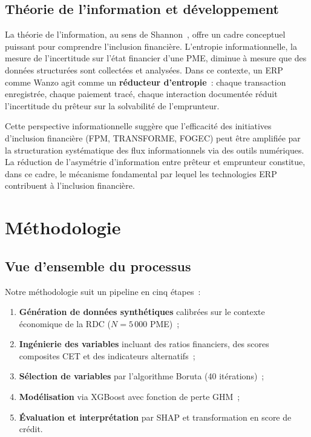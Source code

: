 \documentclass[12pt, a4paper, twocolumn]{article}
\begin{document}
\subsection{Théorie de l'information et développement}
\label{subsec:info_theory_lit}

La théorie de l'information, au sens de Shannon~\cite{shannon1948}, offre un cadre conceptuel puissant pour comprendre l'inclusion financière. L'entropie informationnelle, la mesure de l'incertitude sur l'état financier d'une PME, diminue à mesure que des données structurées sont collectées et analysées. Dans ce contexte, un ERP comme Wanzo agit comme un \textbf{réducteur d'entropie}~: chaque transaction enregistrée, chaque paiement tracé, chaque interaction documentée réduit l'incertitude du prêteur sur la solvabilité de l'emprunteur.

Cette perspective informationnelle suggère que l'efficacité des initiatives d'inclusion financière (FPM, TRANSFORME, FOGEC) peut être amplifiée par la structuration systématique des flux informationnels via des outils numériques. La réduction de l'asymétrie d'information entre prêteur et emprunteur constitue, dans ce cadre, le mécanisme fondamental par lequel les technologies ERP contribuent à l'inclusion financière.

\section{Méthodologie}
\label{sec:methodologie}

\subsection{Vue d'ensemble du processus}
\label{subsec:vue_ensemble}

Notre méthodologie suit un pipeline en cinq étapes~:

\begin{enumerate}[leftmargin=*]
  \item \textbf{Génération de données synthétiques} calibrées sur le contexte économique de la RDC ($N=5\,000$ PME)~;
  \item \textbf{Ingénierie des variables} incluant des ratios financiers, des scores composites CET et des indicateurs alternatifs~;
  \item \textbf{Sélection de variables} par l'algorithme Boruta (40 itérations)~;
  \item \textbf{Modélisation} via XGBoost avec fonction de perte GHM~;
  \item \textbf{Évaluation et interprétation} par SHAP et transformation en score de crédit.
\end{enumerate}
\end{document}
